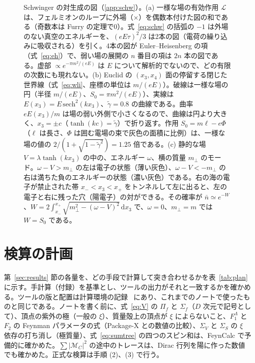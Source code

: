 \documentclass[a4paper,10pt]{ltjsarticle}
\newcommand{\dd}{\mathrm{d}}
\begin{document}
\begin{figure}[tbp]
\caption{Schwinger の対生成の図（\ref{app:schw}）。(a) 一様な場の有効作用 $\mathcal L$ は、フェルミオンのループに外場（$\times$）を偶数本付けた図の和である（奇数本は Furry の定理で0）。式~\eqref{eq:schw} の括弧の $-1$ は外場のない真空のエネルギーを、$(eE\tau)^2/3$ は2本の図（電荷の繰り込みに吸収される）を引く。4本の図が Euler--Heisenberg の項（式~\eqref{eq:eh}）で、弱い場の展開の $n$ 番目の項は $2n$ 本の図である。虚部 $\propto e^{-\pi m^2/(eE)}$ は $E$ について解析的でないので、どの有限の次数にも現れない。(b) Euclid の $(x_3,x_4)$ 面の停留する閉じた世界線（式~\eqref{eq:wli}、座標の単位は $m/(eE)$）。破線は一様な場の円（半径 $m/(eE)$、$S_0=\pi m^2/(eE)$）、実線は $E(x_3)=E\,\mathrm{sech}^2(kx_3)$、$\tilde\gamma=0.8$ の曲線である。曲率 $eE(x_3)/m$ は場の弱い外側で小さくなるので、曲線は円より大きく、$x_3=\pm c$（$\tanh(kc)=\tilde\gamma$）で折り返す。作用 $S_0=m\ell-e\Phi$（$\ell$ は長さ、$\Phi$ は囲む電場の束で灰色の面積に比例）は、一様な場の値の $2/(1+\sqrt{1-\tilde\gamma^2})=1.25$ 倍である。(c) 静的な場 $V=\lambda\tanh(kx_3)$ の中の、エネルギー $\omega$、横の質量 $m_\perp$ のモード。$\omega-V>m_\perp$ の左は電子の状態（薄い灰色）、$\omega-V<-m_\perp$ の右は満ちた負のエネルギーの状態（濃い灰色）である。右の海の電子が禁止された帯 $x_-<x_3<x_+$ をトンネルして左に出ると、左の電子と右に残った穴（陽電子）の対ができる。その確率が $\bar n\simeq e^{-W}$、$W=2\int_{x_-}^{x_+}\sqrt{m_\perp^2-(\omega-V)^2}\,\dd x_3$ で、$\omega=0$、$m_\perp=m$ では $W=S_0$ である。}
\label{fig:schwdiag}
\end{figure}

\FloatBarrier
\section{検算の計画}\label{sec:plan}

第~\ref{sec:results} 節の各量を、どの手段で計算して突き合わせるかを表~\ref{tab:plan} に示す。手計算（付録）を基準とし、ツールの出力がそれと一致するかを確かめる。ツールの版と配置は計算環境の記録~\cite{env} にあり、これまでのノートで使ったものと同じである。ノートを書く前に、式~\eqref{eq:V} の $\Pi_f$ と $\Sigma_f$（$D$ 次元で記号として）、頂点の紫外の極（一般の $\xi$）、質量殻上の頂点が $\xi$ によらないこと、$F_1^\Lambda$ と $F_2$ の Feynman パラメータの式（Package-X との数値の比較）、$\Sigma_V$ と $\Sigma_S$ の $\xi$ 依存の打ち消し（極質量）、式~\eqref{eq:sumtree} の四つのスピン和は、FeynCalc で予備的に確かめた。$\sum|\mathcal M_C|^2$ の途中のトレースは、Dirac 行列を陽に作った数値でも確かめた。正式な検算は手順 (2)、(3) で行う。
\end{document}
